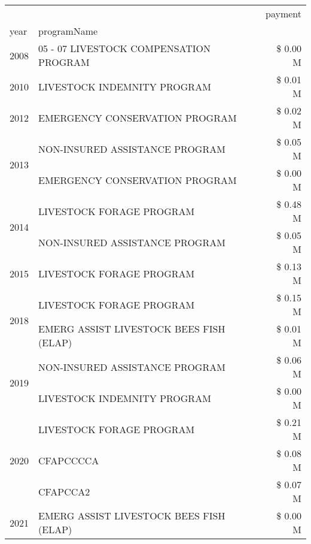 \begin{tabular}{llr}
\toprule
 &  & payment \\
year & programName &  \\
\midrule
2008 & 05 - 07 LIVESTOCK COMPENSATION PROGRAM & \$ 0.00 M \\
\cline{1-3}
2010 & LIVESTOCK INDEMNITY PROGRAM & \$ 0.01 M \\
\cline{1-3}
2012 & EMERGENCY CONSERVATION PROGRAM & \$ 0.02 M \\
\cline{1-3}
\multirow[t]{2}{*}{2013} & NON-INSURED ASSISTANCE PROGRAM & \$ 0.05 M \\
 & EMERGENCY CONSERVATION PROGRAM & \$ 0.00 M \\
\cline{1-3}
\multirow[t]{2}{*}{2014} & LIVESTOCK FORAGE PROGRAM & \$ 0.48 M \\
 & NON-INSURED ASSISTANCE PROGRAM & \$ 0.05 M \\
\cline{1-3}
2015 & LIVESTOCK FORAGE PROGRAM & \$ 0.13 M \\
\cline{1-3}
\multirow[t]{2}{*}{2018} & LIVESTOCK FORAGE PROGRAM & \$ 0.15 M \\
 & EMERG ASSIST LIVESTOCK BEES FISH (ELAP) & \$ 0.01 M \\
\cline{1-3}
\multirow[t]{2}{*}{2019} & NON-INSURED ASSISTANCE PROGRAM & \$ 0.06 M \\
 & LIVESTOCK INDEMNITY PROGRAM & \$ 0.00 M \\
\cline{1-3}
\multirow[t]{3}{*}{2020} & LIVESTOCK FORAGE PROGRAM & \$ 0.21 M \\
 & CFAPCCCCA & \$ 0.08 M \\
 & CFAPCCA2 & \$ 0.07 M \\
\cline{1-3}
2021 & EMERG ASSIST LIVESTOCK BEES FISH (ELAP) & \$ 0.00 M \\
\cline{1-3}
\bottomrule
\end{tabular}
